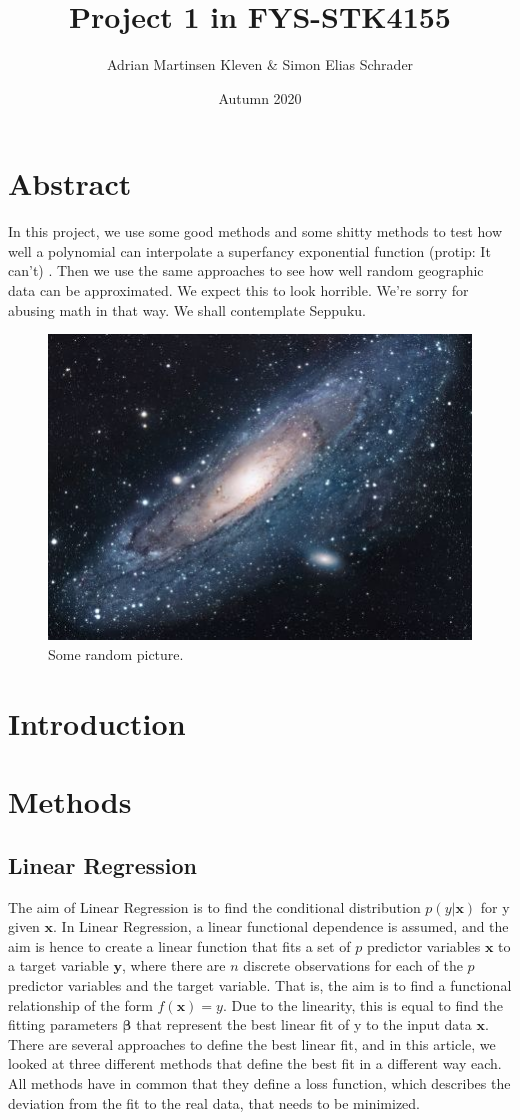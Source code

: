 \documentclass[11pt,a4paper]{article}
\title{Project 1 in FYS-STK4155}
\author{Adrian Martinsen Kleven & Simon Elias Schrader }
\date{Autumn 2020}
\begin{document}
\maketitle
\tableofcontents

\listoffigures
\listoftables


\clearpage
\section{Abstract}
In this project, we use some good methods and some shitty methods to test how well a polynomial can interpolate a superfancy exponential function (protip: It can't) . Then we use the same approaches to see how well random geographic data can be approximated. We expect this to look horrible. We're sorry for abusing math in that way. We shall contemplate Seppuku.

\begin{figure}[H]
\centering
\includegraphics[scale=1.7]{universe}
\caption{Some random picture.}
\label{fig:universe}
\end{figure}
\section{Introduction}
\section{Methods}
\subsection{Linear Regression}
The aim of Linear Regression is to find the conditional distribution $p(y|\bm{x})$ for y given $\bm{x}$. In Linear Regression, a linear functional dependence is assumed, and the aim is hence to create a linear function that fits a set of $p$ predictor variables $\bm{x}$ to a target variable $\bm{y}$, where there are $n$ discrete observations for each of the $p$ predictor variables and the target variable. That is, the aim is to find a functional relationship of the form $f(\bm{x})=y$. Due to the linearity, this is equal to find the fitting parameters $\bm{\beta}$ that represent the best linear fit of y to the input data $\bm{x}$. There are several approaches to define the best linear fit, and in this article, we looked at three different methods that define the best fit in a different way each. All methods have in common that they define a loss function, which describes the deviation from the fit to the real data, that needs to be minimized.
\end{document}
